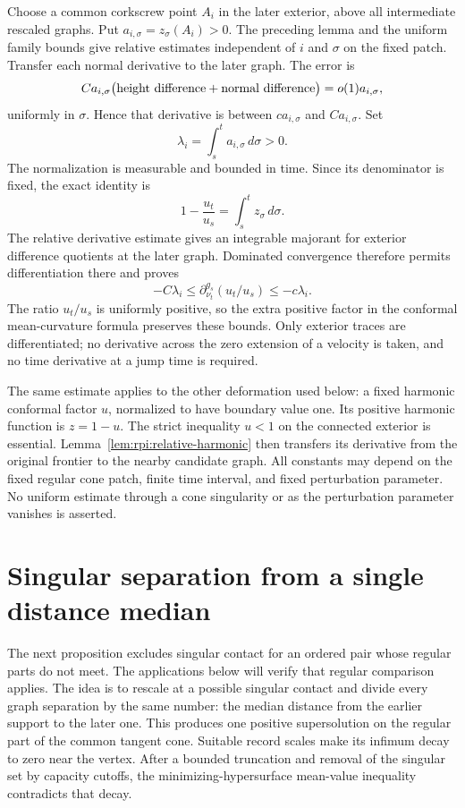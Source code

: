 Choose a common corkscrew point $A_i$ in the later exterior, above
all intermediate rescaled graphs. Put
$a_{i,\sigma}=z_\sigma(A_i)>0$. The preceding lemma and the uniform
family bounds give relative estimates independent of $i$ and $\sigma$
on the fixed patch. Transfer each normal derivative to the later
graph. The error is
\[
 C a_{i,\sigma}
  \bigl(\hbox{height difference}+\hbox{normal difference}\bigr)
       =o(1)a_{i,\sigma},
\]
uniformly in $\sigma$. Hence that derivative is between
$c a_{i,\sigma}$ and $C a_{i,\sigma}$. Set
\[
 \lambda_i=\int_s^t a_{i,\sigma}\,d\sigma>0.
\]
The normalization is measurable and bounded in time. Since its
denominator is fixed, the exact identity is
\begin{equation}\label{eq:rpi:relative-integral}
 1-\frac{u_t}{u_s}=\int_s^t z_\sigma\,d\sigma.
\end{equation}
The relative derivative estimate gives an integrable majorant for
exterior difference quotients at the later graph. Dominated convergence
therefore permits differentiation there and proves
\begin{equation}\label{eq:rpi:relative-forcing}
 -C\lambda_i\le
    \partial_{\nu_t}^{g_s}(u_t/u_s)
      \le-c\lambda_i.
\end{equation}
The ratio $u_t/u_s$ is uniformly positive, so the extra positive factor
in the conformal mean-curvature formula preserves these bounds. Only
exterior traces are differentiated; no derivative across the zero
extension of a velocity is taken, and no time derivative at a jump
time is required.

The same estimate applies to the other deformation used below: a
fixed harmonic conformal factor $u$, normalized to have boundary value
one. Its positive harmonic function is $z=1-u$.
The strict inequality $u<1$ on the connected exterior is essential.
Lemma~\ref{lem:rpi:relative-harmonic} then transfers its derivative
from the original frontier to the nearby candidate graph. All constants
may depend on the fixed regular cone patch, finite time interval, and
fixed perturbation parameter. No uniform estimate through a cone
singularity or as the perturbation parameter vanishes is asserted.

\section{Singular separation from a single distance median}
\label{sec:rpi:median-separation}

The next proposition excludes singular contact for an ordered pair
whose regular parts do not meet. The applications below will verify
that regular comparison applies. The idea is to rescale at a possible
singular contact and divide every graph separation by the same number: the median distance from the earlier support to the later
one. This produces one positive supersolution on the regular part of
the common tangent cone. Suitable record scales make its infimum
decay to zero near the vertex. After a bounded truncation and removal
of the singular set by capacity cutoffs, the minimizing-hypersurface
mean-value inequality contradicts that decay.

